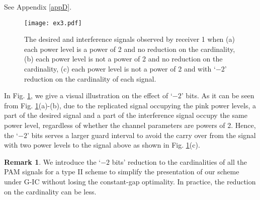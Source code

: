 \documentclass[12pt, draftclsnofoot, onecolumn]{IEEEtran}
\theoremstyle{definition}
\newtheorem{remark}{Remark}
\begin{document}
\begin{IEEEproof}
See Appendix \ref{appD}.
\end{IEEEproof}

\begin{figure}[t!]
	\centering
\texttt{[image: ex3.pdf]}
\caption{The desired and interference signals observed by receiver 1 when (a) each power level is a power of 2 and no reduction on the cardinality, (b) each power level is not a power of 2 and no reduction on the cardinality, (c) each power level is not a power of 2 and with `$-2$' reduction on the cardinality of each signal.}
\label{fig:type_IIa_rx}
\end{figure}

In Fig. \ref{fig:type_IIa_rx}, we give a visual illustration on the effect of `$-2$' bits. As it can be seen from Fig. \ref{fig:type_IIa_rx}(a)-(b), due to the replicated signal occupying the pink power levels, a part of the desired signal and a part of the interference signal occupy the same power level, regardless of whether the channel parameters are powers of 2. %
Hence, the `$-2$' bits serves a larger guard interval to avoid the carry over from the signal with two power levels to the signal above as shown in Fig. \ref{fig:type_IIa_rx}(c).




\begin{remark}
We introduce the `$-2$ bits' reduction to the cardinalities of all the PAM signals for a type II scheme to simplify the presentation of our scheme under G-IC without losing the constant-gap optimality. In practice, the reduction on the cardinality can be less. 
\end{remark}
\end{document}
